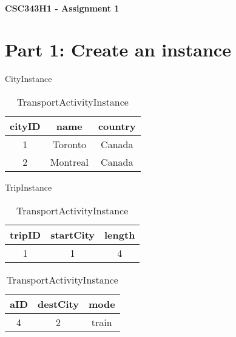 \documentclass{article}
\begin{document}
~~~\vspace{-2.0cm}

\noindent
{\LARGE\bf CSC343H1 - Assignment 1}

\section*{Part 1: Create an instance}

\begin{table}[H]
\parbox{.3\linewidth}{
    \centering
    \caption*{CityInstance}
    \begin{tabular}{|c|c|c|} 
    \hline
    cityID & name & country \\ [.5ex] 
    \hline\hline
    1 & Toronto & Canada \\
    \hline
    2 & Montreal & Canada \\
    \hline
    \end{tabular}
}
\hfill
\parbox{.3\linewidth}{
    \centering
    \caption*{TripInstance}
    \begin{tabular}{|c|c|c|} 
    \hline
    tripID & startCity & length \\ [.5ex] 
    \hline\hline
    1 & 1 & 4 \\
    \hline
    \end{tabular}
}
\hfill
\parbox{.3\linewidth}{
    \centering
    \caption*{TransportActivityInstance}
    \begin{tabular}{|c|c|c|} 
    \hline
    aID & destCity & mode \\ [.5ex] 
    \hline\hline
    4 & 2 & train \\
    \hline
    \end{tabular}
}
\end{table}
\end{document}
